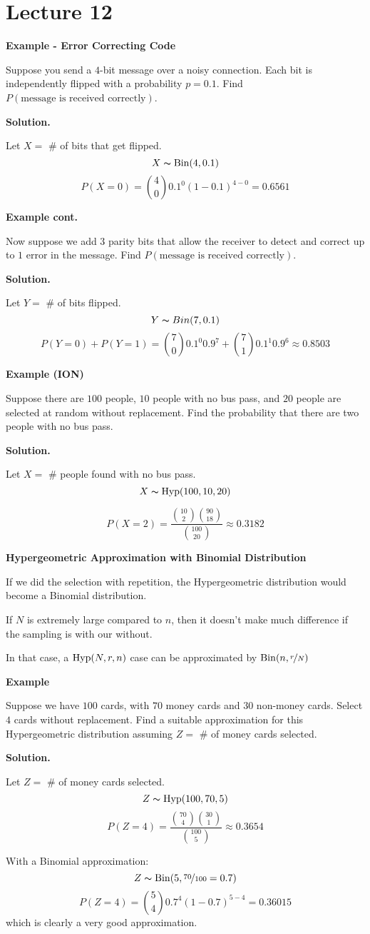 \section{Lecture 12}
\textbf{Example - Error Correcting Code}

Suppose you send a $ 4 $-bit message over a noisy connection.
Each bit is independently flipped with a probability $ p=0.1 $. Find
$ P(\text{message is received correctly}) $.

\textbf{Solution.}

Let $ X= $ \# of bits that get flipped.
\[ X \thicksim \operatorname{Bin}(4,0.1) \]
\[ P(X=0)=\binom{4}{0}0.1^0(1-0.1)^{4-0}=0.6561 \]

\textbf{Example cont.}

Now suppose we add $ 3 $ parity bits that allow the receiver
to detect and correct up to $ 1 $ error in the message. Find
$ P(\text{message is received correctly}) $.

\textbf{Solution.}

Let $ Y= $ \# of bits flipped.
\[ Y \thicksim Bin(7,0.1) \]
\[P(Y=0)+P(Y=1)= \binom{7}{0}0.1^0 0.9^7 + \binom{7}{1}0.1^1 0.9^6\approx 0.8503 \]

\textbf{Example (ION)}

Suppose there are $ 100 $ people, $ 10 $ people with no bus pass,
and $ 20 $ people are selected at random without replacement. 
Find the probability that there are two people with no bus pass.

\textbf{Solution.}

Let $ X= $ \# people found with no bus pass.
\[ X \thicksim \operatorname{Hyp}(100,10,20) \]

\[ P(X=2)=\frac{\binom{10}{2}\binom{90}{18}}{\binom{100}{20}}\approx 0.3182 \]

\textbf{Hypergeometric Approximation with Binomial Distribution}

If we did the selection with repetition, the Hypergeometric distribution
would become a Binomial distribution.

If $ N $ is extremely large compared to $ n $, then it doesn't make much difference
if the sampling is with our without.

In that case, a $ \operatorname{Hyp}(N,r,n) $ case can be approximated by $ \operatorname{Bin}(n,\nicefrac{r}{N}) $

\textbf{Example}

Suppose we have $ 100 $ cards, with $ 70 $ money cards and $ 30 $ non-money cards.
Select $ 4 $ cards without replacement. 
Find a suitable approximation for this Hypergeometric distribution assuming
$ Z= $ \# of money cards selected.

\textbf{Solution.}

Let $ Z= $ \# of money cards selected.
\[ Z \thicksim \operatorname{Hyp}(100,70,5) \]
\[ P(Z=4)=\frac{\binom{70}{4}\binom{30}{1}}{\binom{100}{5}}\approx 0.3654 \]

With a Binomial approximation:
\[ Z \thicksim \operatorname{Bin}(5,\nicefrac{70}{100}=0.7) \]
\[ P(Z=4)=\binom{5}{4}0.7^4(1-0.7)^{5-4}= 0.36015 \]
which is clearly a very good approximation.
